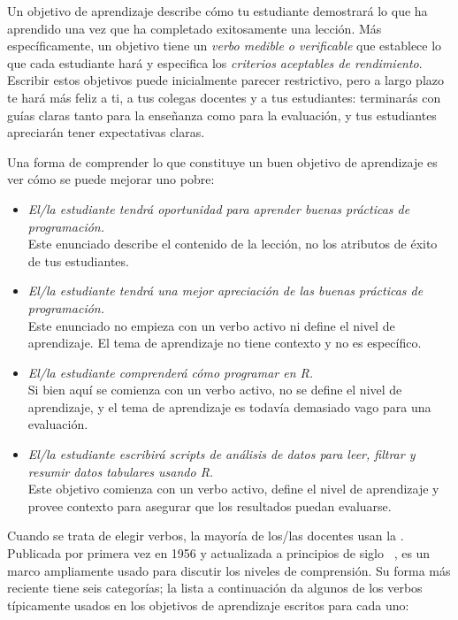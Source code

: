 Un objetivo de aprendizaje describe cómo tu estudiante demostrará lo que ha aprendido
una vez que ha completado exitosamente una lección.
Más específicamente,
un objetivo tiene un \emph{verbo medible o verificable} que establece lo que cada estudiante hará
y especifica los \emph{criterios aceptables de rendimiento}.
Escribir estos objetivos puede inicialmente parecer restrictivo,
pero a largo plazo te hará más feliz a ti,
a tus colegas docentes
y a tus estudiantes:
terminarás con guías claras tanto para la enseñanza como para la evaluación,
y tus estudiantes apreciarán tener expectativas claras.

Una forma de comprender lo que constituye un buen objetivo de aprendizaje
es ver cómo se puede mejorar uno pobre:

 \begin{itemize}
 
\item
  \emph{El/la estudiante tendrá oportunidad para aprender buenas prácticas de programación.}\\
Este enunciado describe el contenido de la lección,
no los atributos de éxito de tus estudiantes.\\
 
\item
  \emph{El/la estudiante tendrá una mejor apreciación
de las buenas prácticas de programación.}\\
 Este enunciado no empieza con un verbo activo ni define el nivel de aprendizaje.
 El tema de aprendizaje no tiene contexto y no es específico.\\
 
\item
  \emph{El/la estudiante comprenderá cómo programar en R.}\\
  Si bien aquí se comienza con un verbo activo,
   no se define el nivel de aprendizaje,
  y el tema de aprendizaje es todavía demasiado vago para una evaluación.\\
 
\item
  \emph{El/la estudiante escribirá scripts de análisis de datos para leer, filtrar y resumir datos tabulares usando R.}\\
 Este objetivo comienza con un verbo activo,
define el nivel de aprendizaje
y provee contexto para asegurar que los resultados puedan evaluarse.
\end{itemize}
 
Cuando se trata de elegir verbos,
la mayoría de los/las docentes usan la .
Publicada por primera vez en 1956 y actualizada a principios de siglo ~\cite{Ande2001},
es un marco ampliamente usado para discutir los niveles de comprensión.
Su forma más reciente tiene seis categorías;
la lista a continuación da algunos de los verbos típicamente usados en los objetivos de aprendizaje escritos para cada uno:


